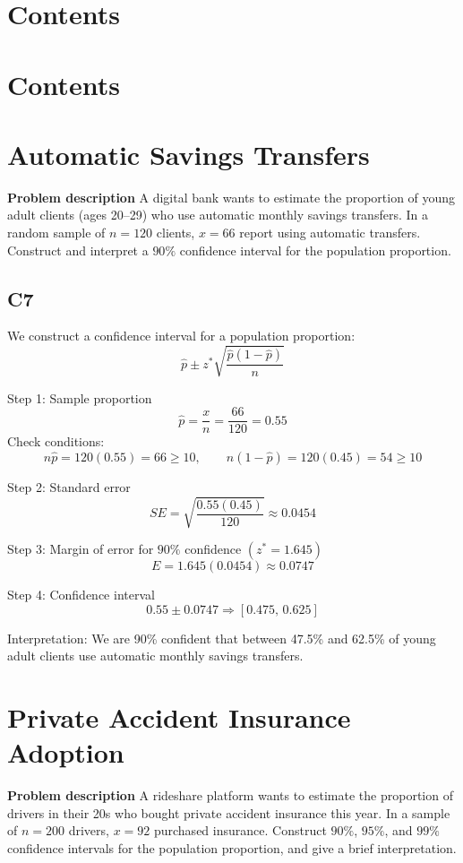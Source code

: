 

	\section*{Contents}
	\setcounter{tocdepth}{2}
	\setcounter{secnumdepth}{1}
\section*{Contents}
\setcounter{tocdepth}{2}
\setcounter{secnumdepth}{1}
\tableofcontents
	\section{Automatic Savings Transfers}
	\textbf{Problem description}
	A digital bank wants to estimate the proportion of young adult clients (ages 20--29) who use automatic monthly savings transfers. In a random sample of \(n=120\) clients, \(x=66\) report using automatic transfers. Construct and interpret a \(90\%\) confidence interval for the population proportion.
	
	\subsection*{C7}
	We construct a confidence interval for a population proportion:
	\[
	\hat p \pm z^*\sqrt{\frac{\hat p(1-\hat p)}{n}}
	\]
	
	Step 1: Sample proportion
	\[
	\hat p=\frac{x}{n}=\frac{66}{120}=0.55
	\]
	Check conditions:
	\[
	n\hat p=120(0.55)=66\ge 10,\qquad n(1-\hat p)=120(0.45)=54\ge 10
	\]
	
	Step 2: Standard error
	\[
	SE=\sqrt{\frac{0.55(0.45)}{120}}\approx 0.0454
	\]
	
	Step 3: Margin of error for \(90\%\) confidence \((z^*=1.645)\)
	\[
	E=1.645(0.0454)\approx 0.0747
	\]
	
	Step 4: Confidence interval
	\[
	0.55\pm 0.0747\Rightarrow [0.475,\,0.625]
	\]
	
	Interpretation: We are 90\% confident that between 47.5\% and 62.5\% of young adult clients use automatic monthly savings transfers.
	
	\section{Private Accident Insurance Adoption}
	\textbf{Problem description}
	A rideshare platform wants to estimate the proportion of drivers in their 20s who bought private accident insurance this year. In a sample of \(n=200\) drivers, \(x=92\) purchased insurance. Construct \(90\%\), \(95\%\), and \(99\%\) confidence intervals for the population proportion, and give a brief interpretation.
	
